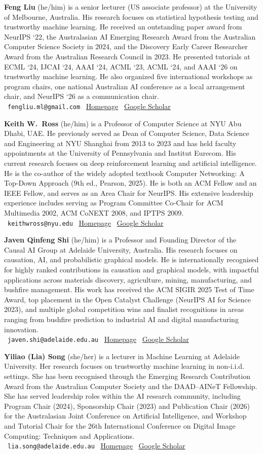 \documentclass{article}
\newcommand{\orginfo}[3]{\\{\small\faEnvelope\ \texttt{#1} \hfill \faHome\ \href{https://#2}{Homepage} \hfill \faGraduationCap\ \href{https://scholar.google.com/citations?user=#3}{Google Scholar}}}
\begin{document}
\textbf{Feng Liu} (he/him) is a senior lecturer (US associate professor) at the University of Melbourne, Australia. His research focuses on statistical hypothesis testing and trustworthy machine learning. He received an outstanding paper award from NeurIPS ‘22, the Australasian AI Emerging Research Award from the Australian Computer Science Society in 2024, and the Discovery Early Career Researcher Award from the Australian Research Council in 2023. He presented tutorials at ECML ‘24, IJCAI ‘24, AAAI ‘24, ACML ‘23, ACML ‘24, and AAAI ‘26 on trustworthy machine learning. He also organized five international workshops as program chairs, one national Australian AI conference as a local arrangement chair, and NeurIPS ‘26 as a communication chair.
\orginfo{fengliu.ml@gmail.com}{fengliu90.github.io}{[scholar\_id]}

\textbf{Keith W.\ Ross} (he/him) is a Professor of Computer Science at NYU Abu Dhabi, UAE. He previously served as Dean of Computer Science, Data Science and Engineering at NYU Shanghai from 2013 to 2023 and has held faculty appointments at the University of Pennsylvania and Institut Eurecom. His current research focuses on deep reinforcement learning and artificial intelligence. He is the co-author of the widely adopted textbook Computer Networking: A Top-Down Approach (9th ed., Pearson, 2025). He is both an ACM Fellow and an IEEE Fellow, and serves as an Area Chair for NeurIPS. His extensive leadership experience includes serving as Program Committee Co-Chair for ACM Multimedia 2002, ACM CoNEXT 2008, and IPTPS 2009.
\orginfo{keithwross@nyu.edu}{https://sites.google.com/nyu.edu/keithross/}{RhUcYmQAAAAJ}

\textbf{Javen Qinfeng Shi} (he/him) is a Professor and Founding Director of the Causal AI Group at Adelaide University, Australia. His research focuses on causation, AI, and probabilistic graphical models. He is internationally recognised for highly ranked contributions in causation and graphical models, with impactful applications across materials discovery, agriculture, mining, manufacturing, and bushfire management. His work has received the ACM SIGIR 2025 Test of Time Award, top placement in the Open Catalyst Challenge (NeurIPS AI for Science 2023), and multiple global competition wins and finalist recognitions in areas ranging from bushfire prediction to industrial AI and digital manufacturing innovation. 
\orginfo{javen.shi@adelaide.edu.au}{https://javenshi.org/}{h6O9vYkAAAAJ}

\textbf{Yiliao (Lia) Song} (she/her) is a lecturer in Machine Learning at Adelaide University. Her research focuses on trustworthy machine learning in non-i.i.d. settings. She has been recognised through the Emerging Research Contribution Award from the Australian Computer Society and the DAAD–AINeT Fellowship. She has served leadership roles within the AI research community, including Program Chair (2024), Sponsorship Chair (2023) and Publication Chair (2026) for the Australasian Joint Conference on Artificial Intelligence, and Workshop and Tutorial Chair for the 26th International Conference on Digital Image Computing: Techniques and Applications.
\orginfo{lia.song@adelaide.edu.au}{songyiliao.github.io}{lKzKBHUAAAAJ}
\end{document}
